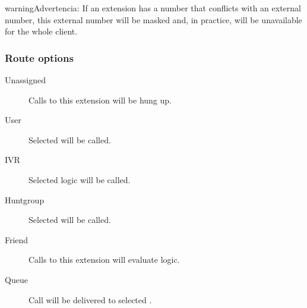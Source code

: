 \documentclass[letterpaper,10pt,spanish]{sphinxmanual}
\begin{document}
\begin{notice}{warning}{Advertencia:}
If an extension has a number that conflicts with an external
number, this external number will be masked and, in practice, will be
unavailable for the whole client.
\end{notice}


\subsubsection{Route options}
\label{administration_portal/client/vpbx/extensions:route-options}\begin{description}
\item[{Unassigned}] \leavevmode{}\label{administration_portal/client/vpbx/extensions:term-unassigned}
Calls to this extension will be hung up.

\item[{User}] \leavevmode{}\label{administration_portal/client/vpbx/extensions:term-user}
Selected {\hyperref[administration_portal/client/vpbx/users:users]{}} will be called.

\item[{IVR}] \leavevmode{}\label{administration_portal/client/vpbx/extensions:term-ivr}
Selected {\hyperref[administration_portal/client/vpbx/routing_endpoints/ivrs:ivrs]{}} logic will be called.

\item[{Huntgroup}] \leavevmode{}\label{administration_portal/client/vpbx/extensions:term-huntgroup}
Selected {\hyperref[administration_portal/client/vpbx/routing_endpoints/hunt_groups:huntgroups]{}} will be called.

\item[{Friend}] \leavevmode{}\label{administration_portal/client/vpbx/extensions:term-friend}
Calls to this extension will evaluate {\hyperref[administration_portal/client/vpbx/routing_endpoints/friends/index:friends]{}} logic.

\item[{Queue}] \leavevmode{}\label{administration_portal/client/vpbx/extensions:term-queue}
Call will be delivered to selected {\hyperref[administration_portal/client/vpbx/routing_endpoints/queues:queues]{}}.


\end{description}
\end{document}
